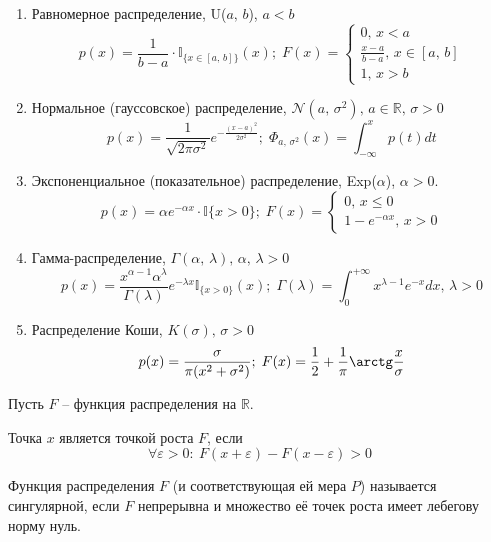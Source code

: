\begin{example}
	\begin{enumerate}
		\item Равномерное распределение, U($a,\,b$), $a < b$
		      \[
			      p(x) = \frac{1}{b - a}\cdot\mathbb{I}_{\{x \in [a,\,b]\}}(x);\; F(x) = \begin{cases}
				      0,\, x < a                           \\
				      \frac{x - a}{b - a},\, x \in [a,\,b] \\
				      1,\, x > b
			      \end{cases}
		      \]
		\item Нормальное (гауссовское) распределение, $\mathcal{N}(a,\,\sigma^2),\, a \in \mathbb{R},\, \sigma > 0$
		      \[p(x) = \frac{1}{\sqrt{2\pi\sigma^2}}e^{-\frac{(x - a)^2}{2\sigma^2}};\; \Phi_{a,\,\sigma^2}(x) = \int_{-\infty}^x p(t)dt\]
		\item Экспоненциальное (показательное) распределение, Exp($\alpha$), $\alpha > 0$.
		      \[
			      p(x) = \alpha e^{-\alpha x}\cdot\mathbb{I}\{x > 0\};\; F(x) = \begin{cases}
				      0,\, x \leq 0 \\
				      1 - e^{-\alpha x},\, x > 0
			      \end{cases}
		      \]
		\item Гамма-распределение, $\Gamma(\alpha,\, \lambda),\, \alpha,\, \lambda > 0$
		      \[
			      p(x) = \frac{x^{\alpha - 1}\alpha^\lambda}{\Gamma(\lambda)}e^{-\lambda x}\mathbb{I}_{\{x > 0\}}(x);\; \Gamma(\lambda) = \int_0^{+\infty} x^{\lambda - 1}e^{-x}dx,\, \lambda > 0
		      \]
		\item Распределение Коши, $K(\sigma),\, \sigma > 0$
		      \[p(x) = \frac{\sigma}{\pi(x^2 + \sigma^2)};\; F(x) = \frac{1}{2} + \frac{1}{\pi}\arctg\frac{x}{\sigma}\]
	\end{enumerate}
\end{example}

\begin{definition}
	Пусть $F$ -- функция распределения на $\mathbb{R}$.

	Точка $x$ является точкой роста $F$, если
	\[\forall \varepsilon > 0 :\: F(x + \varepsilon) - F(x - \varepsilon) > 0\]
\end{definition}

\begin{definition}
	Функция распределения $F$ (и соответствующая ей мера $P$) называется сингулярной, если $F$ непрерывна и множество её точек роста имеет лебегову норму нуль.
\end{definition}

